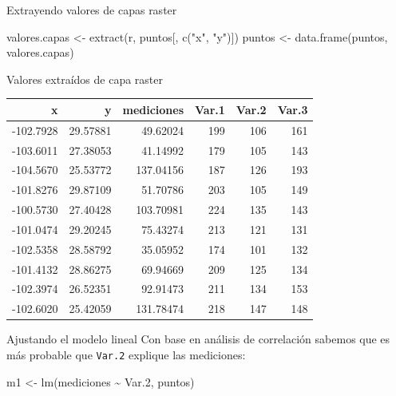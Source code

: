 \documentclass[
  11pt,
  ignorenonframetext,
]{beamer}
\newenvironment{Shaded}{}{}
\newcommand{\FloatTok}[1]{\textcolor[rgb]{0.25,0.63,0.44}{#1}}
\newcommand{\FunctionTok}[1]{\textcolor[rgb]{0.02,0.16,0.49}{#1}}
\newcommand{\NormalTok}[1]{#1}
\newcommand{\OtherTok}[1]{\textcolor[rgb]{0.00,0.44,0.13}{#1}}
\newcommand{\SpecialCharTok}[1]{\textcolor[rgb]{0.25,0.44,0.63}{#1}}
\newcommand{\StringTok}[1]{\textcolor[rgb]{0.25,0.44,0.63}{#1}}
\begin{document}
\begin{frame}[fragile]{Extrayendo valores de capas raster}
\protect\hypertarget{extrayendo-valores-de-capas-raster}{}
\begin{Shaded}
\begin{Highlighting}[]
\NormalTok{valores.capas }\OtherTok{\textless{}{-}} \FunctionTok{extract}\NormalTok{(r, puntos[, }\FunctionTok{c}\NormalTok{(}\StringTok{"x"}\NormalTok{, }\StringTok{"y"}\NormalTok{)])}
\NormalTok{puntos }\OtherTok{\textless{}{-}} \FunctionTok{data.frame}\NormalTok{(puntos, valores.capas)}
\end{Highlighting}
\end{Shaded}
\end{frame}

\begin{frame}{Valores extraídos de capa raster}
\protect\hypertarget{valores-extrauxeddos-de-capa-raster}{}
\begin{longtable}[]{@{}rrrrrr@{}}
\toprule()
x & y & mediciones & Var.1 & Var.2 & Var.3 \\
\midrule()
\endhead
-102.7928 & 29.57881 & 49.62024 & 199 & 106 & 161 \\
-103.6011 & 27.38053 & 41.14992 & 179 & 105 & 143 \\
-104.5670 & 25.53772 & 137.04156 & 187 & 126 & 193 \\
-101.8276 & 29.87109 & 51.70786 & 203 & 105 & 149 \\
-100.5730 & 27.40428 & 103.70981 & 224 & 135 & 143 \\
-101.0474 & 29.20245 & 75.43274 & 213 & 121 & 131 \\
-102.5358 & 28.58792 & 35.05952 & 174 & 101 & 132 \\
-101.4132 & 28.86275 & 69.94669 & 209 & 125 & 134 \\
-102.3974 & 26.52351 & 92.91473 & 211 & 134 & 153 \\
-102.6020 & 25.42059 & 131.78474 & 218 & 147 & 148 \\
\bottomrule()
\end{longtable}
\end{frame}

\begin{frame}[fragile]{Ajustando el modelo lineal}
\protect\hypertarget{ajustando-el-modelo-lineal}{}
Con base en análisis de correlación sabemos que es más probable que
\texttt{Var.2} explique las mediciones:

\begin{Shaded}
\begin{Highlighting}[]
\NormalTok{m1 }\OtherTok{\textless{}{-}} \FunctionTok{lm}\NormalTok{(mediciones }\SpecialCharTok{\textasciitilde{}}\NormalTok{ Var}\FloatTok{.2}\NormalTok{, puntos)}
\end{Highlighting}
\end{Shaded}
\end{frame}
\end{document}
